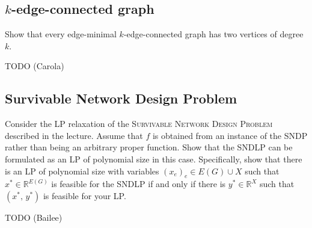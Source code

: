 \documentclass{article}
\newcommand{\R}{\mathbb{R}}
\begin{document}
  \subsection{$k$-edge-connected graph}
  \begin{centerframebox}
    Show that every edge-minimal $k$-edge-connected graph has two vertices of degree $k$.
  \end{centerframebox}
  TODO (Carola)

  \subsection{Survivable Network Design Problem}
  \begin{centerframebox}
    Consider the LP relaxation of the \textsc{Survivable Network Design Problem} described in the lecture.
    Assume that $f$ is obtained from an instance of the SNDP rather than being an arbitrary proper function.
    Show that the SNDLP can be formulated as an LP of polynomial size in this case.
    Specifically, show that there is an LP of polynomial size with variables $(x_e)_e \in E(G) \cup X$
    such that $x^* \in \R^{E(G)}$  is feasible for the SNDLP if and only if there is $y^* \in \R^X$
    such that $(x^*,\, y^*)$ is feasible for your LP.
  \end{centerframebox}
  TODO (Bailee)
\end{document}

